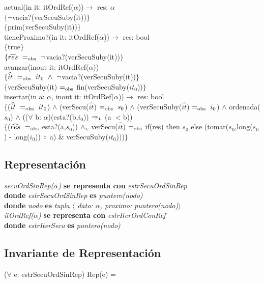 actual(in it: itOrdRef($\alpha$))$\longrightarrow$ res: $\alpha$\\
$\{\neg$vacia?(verSecuSuby(it))$\}$\\
$\{$prim(verSecuSuby(it))$\}$\\

tieneProximo?(in it: itOrdRef($\alpha$))$\longrightarrow$ res: bool\\
$\{$true$\}$\\
$\{\widehat{res}\ \igobs\ \neg$vacia?(verSecuSuby(it))$\}$\\

avanzar(inout it: itOrdRef($\alpha$))\\
$\{\widehat{it}\ \igobs\ it_0\ \wedge\ \neg$vacia?(verSecuSuby(it))$\}$\\
$\{$verSecuSuby(it) $=_{\mathrm{obs}}$ fin(verSecuSuby($it_0$))$\}$\\

insertar(in a: $\alpha$, inout it: itOrdRef($\alpha$))$\longrightarrow$ res: bool\\
$\{$($\widehat{it}\ =_{\mathrm{obs}}\ it_0$) $\wedge$ (verSecu($\widehat{it}$) $=_{\mathrm{obs}}\ s_0$) $\wedge$ (verSecuSuby($\widehat{it}$) $=_{\mathrm{obs}}\ i_0$) $\wedge$ ordenada($s_0$) $\wedge$ (($\forall$ b: $\alpha$)(esta?(b,$i_0$)) $\Rightarrow_{\mathrm{\scriptscriptstyle{L}}}$ (a $<$b))\\
$\{$($\widehat{res}\ =_{\mathrm{obs}}$ esta?(a,$s_0$)) $\land_{\mathrm{\scriptscriptstyle{L}}}$ verSecu($\widehat{it}$) $=_{\mathrm{obs}}$ if(res) then $s_0$ else (tomar($s_0$,long($s_0$) - long($i_0$)) $\circ$ a) $\&$ verSecuSuby($it_0$)))$\}$


\subsection*{Representaci\'on}
\textit{secuOrdSinRep($\alpha$)} \textbf{se representa con} \textit{estrSecuOrdSinRep}\\
\textbf{donde} \textit{estrSecuOrdSinRep} \textbf{es} \textit{puntero(nodo)}\\
\textbf{donde} \textit{nodo} \textbf{es} \textit{tupla $\langle$ dato: $\alpha$, proximo: puntero(nodo)$\rangle$}\\

\textit{itOrdRef($\alpha$)} \textbf{se representa con} \textit{estrIterOrdConRef}\\
\textbf{donde} \textit{estrIterSecu} \textbf{es} \textit{puntero(nodo)}\\

\subsection*{Invariante de Representaci\'on}
\vspace{11pt}
($\forall$ e: estrSecuOrdSinRep) Rep(e) = 

